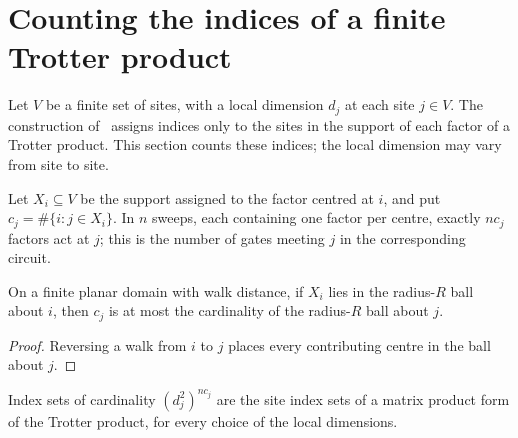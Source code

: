 \section{Counting the indices of a finite Trotter product}
\label{sec:hastings_active_indices}

Let $V$ be a finite set of sites, with a local dimension $d_j$ at each site
$j\in V$. The construction of~\cite[lines 1069--1077]{Hastings2006Solving}
assigns indices only to the sites in the support of each factor of a Trotter
product. This section counts these indices; the local dimension may vary
from site to site.

Let $X_i\subseteq V$ be the support assigned to the factor centred at $i$,
and put $c_j=\#\{i:j\in X_i\}$. In $n$ sweeps, each containing one factor
per centre, exactly $nc_j$ factors act at $j$; this is the number of gates
meeting $j$ in the corresponding circuit.

\begin{lemma}
    \label{thm:hastings_active_cardinality}
    \leanok
    On a finite planar domain with walk distance, if $X_i$ lies in the
    radius-$R$ ball about $i$, then $c_j$ is at most the cardinality of the
    radius-$R$ ball about $j$.
\end{lemma}
\begin{proof}\leanok
    Reversing a walk from $i$ to $j$ places every contributing centre in the
    ball about $j$.
\end{proof}

Index sets of cardinality $(d_j^2)^{nc_j}$ are the site index sets of a
matrix product form of the Trotter product, for every choice of the local
dimensions.

